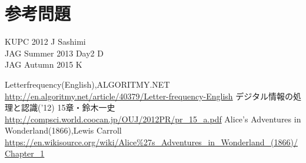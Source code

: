 \documentclass[fleqn]{jarticle}
\begin{document}
\section{参考問題}
KUPC 2012 J Sashimi \\
JAG Summer 2013 Day2 D \\
JAG Autumn 2015 K \\


\begin{thebibliography}{9}
 Letterfrequency(English),ALGORITMY.NET \\
\url{http://en.algoritmy.net/article/40379/Letter-frequency-English}
 デジタル情報の処理と認識('12) 15章・鈴木一史 \\
\url{http://compsci.world.coocan.jp/OUJ/2012PR/pr_15_a.pdf}
 Alice's Adventures in Wonderland(1866),Lewis Carroll \\
\url{https://en.wikisource.org/wiki/Alice%27s_Adventures_in_Wonderland_(1866)/Chapter_1}
\end{thebibliography}
\end{document}
